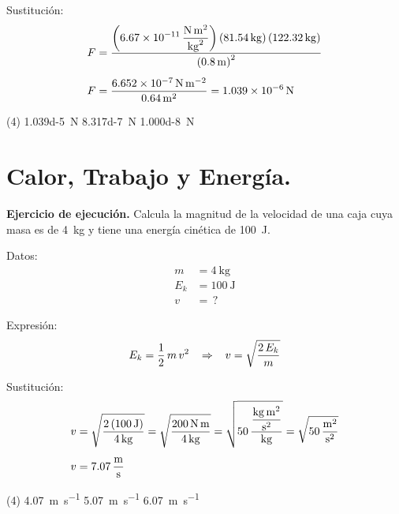 \documentclass[12pt, letter]{exam}
\begin{document}
\begin{questions}
    Sustitución:
    \begin{align*}
    F &= \dfrac{\left( \displaystyle \SI[per-mode=fraction]{6.67d-11}{\newton\square\meter\per\square\kilo\gram} \right) \left( \SI{81.54}{\kilo\gram} \right) \left( \SI{122.32}{\kilo\gram} \right)}{\left( \SI{0.8}{\meter} \right)^{2}} \\[0.5em]
    F &= \dfrac{\SI{6.652d-7}{\newton\per\square\meter}}{\SI{0.64}{\square\meter}} = \SI{1.039d-6}{\newton}
    \end{align*}
    
    \begin{tasks}(4)
        \task \SI{1.039d-5}{\newton}
        \task {}
        \task \SI{8.317d-7}{\newton}
        \task \SI{1.000d-8}{\newton}
    \end{tasks}

    \setcounter{section}{11}

    \section{Calor, Trabajo y Energía.}

    \setcounter{question}{41} \question \label{Ejercicio_12} \textbf{Ejercicio de ejecución. } Calcula la magnitud de la velocidad de una caja cuya masa es de \SI{4}{\kilo\gram} y tiene una energía cinética de \SI{100}{\joule}.

    \begin{minipage}[t]{0.35\linewidth}
    Datos: 
    \begin{align*}
    m &= \SI{4}{\kilo\gram} \\
    E_{k} &= \SI{100}{\joule} \\
    v &= \, ?
    \end{align*}
    \end{minipage}
    \hspace{1cm}
    \begin{minipage}[t]{0.4\linewidth}
    Expresión:
    \begin{align*}
    E_{k} = \dfrac{1}{2} \, m \, v^{2} \hspace{0.3cm} \Rightarrow \hspace{0.3cm} v = \sqrt{\dfrac{2 \, E_{k}}{m}}
    \end{align*}
    \end{minipage}

    Sustitución:
    \begin{align*}
    v &= \sqrt{\dfrac{2 \left( \SI{100}{\joule} \right)}{\SI{4}{\kilo\gram}}} = \sqrt{\dfrac{\SI{200}{\newton\meter}}{\SI{4}{\kilo\gram}}} = \sqrt{50 \, \dfrac{\displaystyle \unit[per-mode=fraction]{\kilo\gram\square\meter\per\square\second}}{\unit{\kilo\gram}}} = \sqrt{\SI[per-mode=fraction]{50}{\square\meter\per\square\second}} \\[0.5em]
    v &= \SI[per-mode=fraction]{7.07}{\meter\per\second}
    \end{align*}
    \begin{tasks}(4)
        \task \SI{4.07}{\meter\per\second}
        \task \SI{5.07}{\meter\per\second}
        \task \SI{6.07}{\meter\per\second}
        \task {}
    \end{tasks}


\end{questions}
\end{document}
